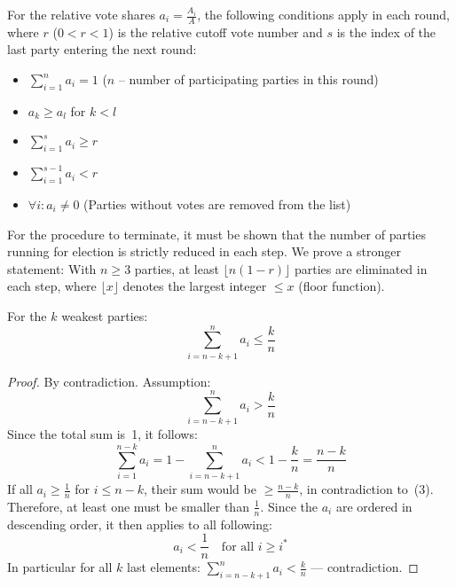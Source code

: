 For the relative vote shares $a_i = \frac{A_i}{A}$, the following
conditions apply in each round, where $r$ ($0 < r < 1$) is the relative cutoff vote number and $s$ is the index of the
last party entering the next round:

\begin{itemize}[label={}]
  \item[(I)]   $\displaystyle\sum_{i=1}^{n} a_i = 1$
    \quad ($n$ -- number of participating parties in this round)
  \item[(II)]  $a_k \geq a_l$ \quad for $k < l$
  \item[(III)] $\displaystyle\sum_{i=1}^{s} a_i \geq r$
  \item[(IV)]  $\displaystyle\sum_{i=1}^{s-1} a_i < r$
  \item[\phantom{(IV)}] $\forall i: a_i \neq 0$ \quad
    (Parties without votes are removed from the list)
\end{itemize}

For the procedure to terminate, it must be shown that the number of parties running for election
is strictly reduced in each step. We prove a stronger statement: With $n \geq 3$
parties, at least $\lfloor n(1-r) \rfloor$ parties are eliminated in each step, where
$\lfloor x \rfloor$ denotes the largest integer $\leq x$ (floor function).

\begin{lemma}
For the $k$ weakest parties:
\begin{equation}
  \sum_{i=n-k+1}^{n} a_i \leq \frac{k}{n}
\end{equation}
\end{lemma}

\begin{proof}
  By contradiction. Assumption:
\begin{equation}
  \sum_{i=n-k+1}^{n} a_i > \frac{k}{n}
\end{equation}
Since the total sum is~1, it follows:
\begin{equation}
  \sum_{i=1}^{n-k} a_i = 1 - \sum_{i=n-k+1}^{n} a_i < 1 - \frac{k}{n} = \frac{n-k}{n}
\end{equation}
If all $a_i \geq \frac{1}{n}$ for $i \leq n-k$, their sum would be $\geq \frac{n-k}{n}$,
in contradiction to~(3). Therefore, at least one must be smaller than $\frac{1}{n}$. Since the
$a_i$ are ordered in descending order, it then applies to all following:
\begin{equation}
  a_i < \frac{1}{n} \quad \text{for all } i \geq i^*
\end{equation}
In particular for all $k$ last elements: $\displaystyle\sum_{i=n-k+1}^{n} a_i < \frac{k}{n}$
--- contradiction.
\end{proof}

